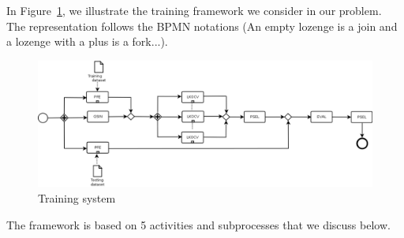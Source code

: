 \documentclass[10pt, conference, compsocconf]{IEEEtran}
\begin{document}
In Figure~\ref{fig:training}, we illustrate the training framework we consider in our problem. The representation follows the 
BPMN notations (An empty lozenge is a join and a lozenge with a plus is a fork...). 

	\begin{figure}[htbp]
	\centering
	\includegraphics[scale=0.3]{./Figures/workflow.png}
	\caption{Training system}
	\label{fig:training}
	\end{figure}

The framework is based on 5 activities and subprocesses that we discuss below.
\end{document}
